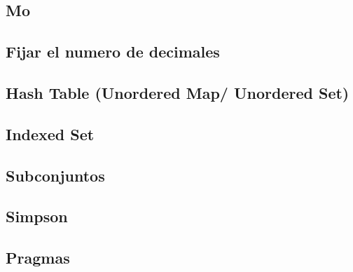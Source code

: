 \documentclass[a4paper,11pt,landscape,twocolumn]{article}
\begin{document}
\subsection{Mo}



\subsection{Fijar el numero de decimales}



\subsection{Hash Table (Unordered Map/ Unordered Set)}



\subsection{Indexed Set}



\subsection{Subconjuntos}



\subsection{Simpson}



\subsection{Pragmas}


\end{document}
